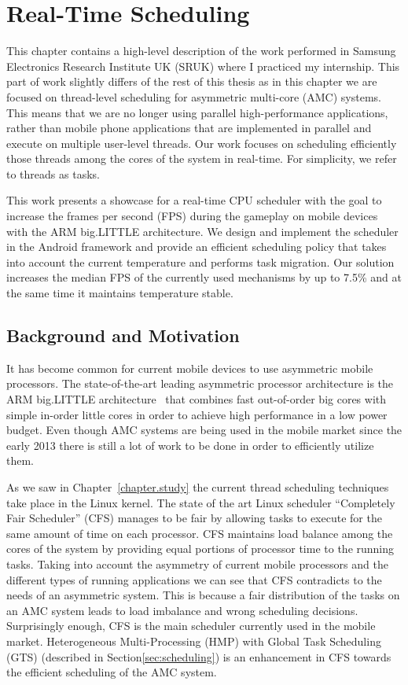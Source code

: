 \chapter{Real-Time Scheduling}
This chapter contains a high-level description of the work performed in Samsung Electronics Research Institute UK (SRUK) where I practiced my internship.
This part of work slightly differs of the rest of this thesis as in this chapter we are focused on thread-level scheduling for asymmetric multi-core (AMC) systems.
This means that we are no longer using parallel high-performance applications, rather than mobile phone applications that are implemented in parallel and execute on multiple user-level threads.
Our work focuses on scheduling efficiently those threads among the cores of the system in real-time.
For simplicity, we refer to threads as tasks.

This work presents a showcase for a real-time CPU scheduler with the goal to increase the frames per second (FPS) during the gameplay on mobile devices with the ARM big.LITTLE architecture. 
We design and implement the scheduler in the Android framework and provide an efficient scheduling policy that takes into account the current temperature and performs task migration. 
Our solution increases the median FPS of the currently used mechanisms by up to 7.5\% and at the same time it maintains temperature stable. 
\newpage

\section{Background and Motivation}
It has become common for current mobile devices to use asymmetric mobile processors. 
The state-of-the-art leading asymmetric processor architecture is the ARM big.LITTLE architecture~\cite{Greenhalgh2011} that combines fast out-of-order big cores with simple in-order little cores in order to achieve high performance in a low power budget. 
Even though AMC systems are being used in the mobile market since the early 2013 there is still a lot of work to be done in order to efficiently utilize them.

As we saw in Chapter~\ref{chapter.study} the current thread scheduling techniques take place in the Linux kernel.
The state of the art Linux scheduler “Completely Fair Scheduler” (CFS)  manages to be fair by allowing tasks to execute for the same amount of time on each processor. 
CFS maintains load balance among the cores of the system by providing equal portions of processor time to the running tasks. 
Taking into account the asymmetry of current mobile processors and the different types of running applications we can see that CFS contradicts to the needs of an asymmetric system.
This is because a fair distribution of the tasks on an AMC system leads to load imbalance and wrong scheduling decisions. 
Surprisingly enough, CFS is the main scheduler currently used in the mobile market.
Heterogeneous Multi-Processing (HMP) with Global Task Scheduling (GTS) (described in Section\ref{sec:scheduling}) is an enhancement in CFS towards the efficient scheduling of the AMC system. 

